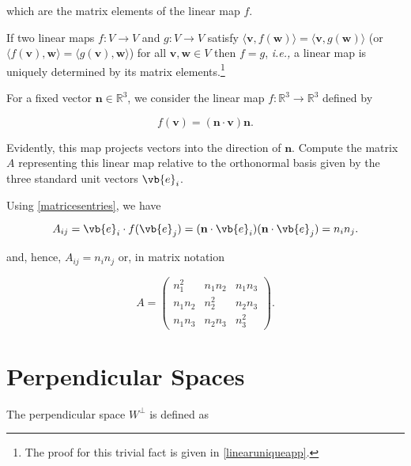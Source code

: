 \documentclass[a4paper,12pt]{report}
\begin{document}
which are the matrix elements of the linear map \(f\).

\begin{lemma} \label{linearuniquemap} 
If two linear maps \( f : V \rightarrow V \) and \( g : V \rightarrow V \) satisfy \( \langle \mathbf{v}, f(\mathbf{w}) \rangle = \langle \mathbf{v}, g(\mathbf{w}) \rangle \) (or \( \langle f(\mathbf{v}), \mathbf{w} \rangle = \langle g(\mathbf{v}), \mathbf{w} \rangle \)) for all \( \mathbf{v}, \mathbf{w} \in V \) then \( f = g \), \textit{i.e.,} a linear map is uniquely determined by its matrix elements.\footnote{The proof for this trivial fact is given in \cref{linearuniqueapp}.} 
\end{lemma}

{For a fixed vector \(\mathbf{n} \in \mathbb{R}^3\), we consider the linear map \(f : \mathbb{R}^3 \to \mathbb{R}^3\) defined by

\begin{equation}
f(\mathbf{v}) = (\mathbf{n} \cdot \mathbf{v}) \mathbf{n}.
\end{equation}

Evidently, this map projects vectors into the direction of \(\mathbf{n}\). Compute the matrix \(A\) representing this linear map relative to the orthonormal basis given by the three standard unit vectors \(\vb{e}_i\).
}
{Using \cref{matricesentries}, we have

\begin{equation}
    A_{ij} = \vb{e}_i \cdot f(\vb{e}_j) = (\mathbf{n} \cdot \vb{e}_i)(\mathbf{n} \cdot \vb{e}_j) = n_i n_j.
\end{equation}
    
and, hence, \(A_{ij} = n_i n_j\) or, in matrix notation
    
\begin{equation}
A = \begin{pmatrix}
n_1^2 & n_1 n_2 & n_1 n_3 \\
n_1 n_2 & n_2^2 & n_2 n_3 \\
n_1 n_3 & n_2 n_3 & n_3^2
\end{pmatrix}.
\end{equation}} 

\section{Perpendicular Spaces}

The perpendicular space \(W^{\perp } \) is defined as 
\end{document}
